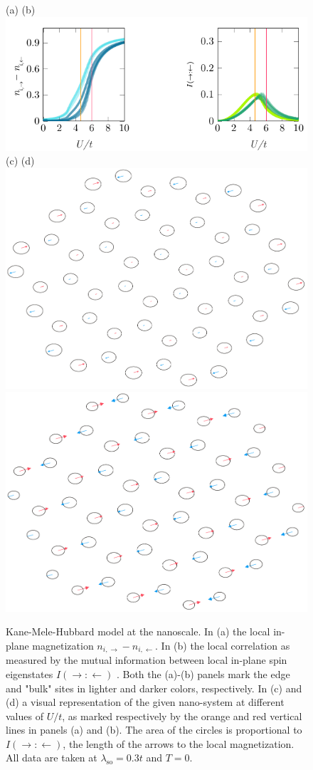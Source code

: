 \documentclass[edipack_sp.tex]{subfiles}
\begin{document}
\begin{figure}
    \centering
    (a) \hspace{12cm} (b) \\
    \includegraphics[width=0.8\linewidth]{figures/flakes_edipack.pdf}\\[3mm]
    (c) \hspace{12cm} (d) \\
    \hspace{1.2cm}
    \includegraphics[width=0.33\linewidth]{figures/3NflakeU4.5_x.pdf} \hspace{1.2cm}
    \includegraphics[width=0.33\linewidth]{figures/3NflakeU6_x.pdf} \vspace{3mm}
    \caption{Kane-Mele-Hubbard model at the nanoscale.
    In (a) the local in-plane
    magnetization $n_{i,\rightarrow}-n_{i,\leftarrow}$. In
    (b) the local correlation as measured by the mutual 
    information between local in-plane spin eigenstates
    $I(\rightarrow:\leftarrow)$ \cite{BellomiaPhD}. Both the
    (a)-(b) panels mark the edge and "bulk" sites in lighter 
    and darker colors, respectively.
    In (c) and (d) a visual representation of the given 
    nano-system at different values of $U/t$, as marked 
    respectively by the orange and red vertical lines 
    in panels (a) and (b). The area of the 
    circles is proportional to $I(\rightarrow:\leftarrow)$, 
    the length of the arrows to the local magnetization.
    All data are taken at $\lambda_\mathrm{so}=0.3t$ and $T=0$.}
    \label{fig:KMflake}
\end{figure}
\end{document}
